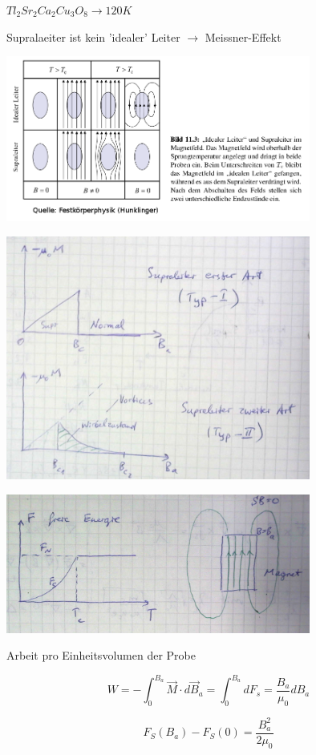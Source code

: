 \(Tl_2Sr_2Ca_2Cu_3O_8 \rightarrow 120K\)

Supralaeiter ist kein 'idealer' Leiter \(\rightarrow \) Meissner-Effekt



\includegraphics[width=0.75\textwidth]{kap13_03.png}




\includegraphics[width=0.75\textwidth]{kap13_04.png}


\includegraphics[width=0.75\textwidth]{kap13_05.png}


Arbeit pro Einheitsvolumen der Probe

\[W=-\int_0^{B_a}\vec M\cdot d\vec B_a = \int_0^{B_a} dF_s = \frac{B_a}{\mu_0}dB_a  \]

\[F_S(B_a) - F_S(0) = \frac{B_a^2}{2\mu_0}\]

